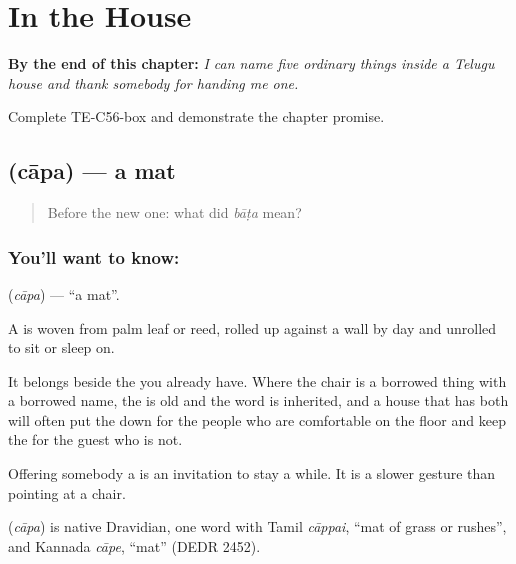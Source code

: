 
\chapter{In the House}
\label{ch:te-house}

\begin{chapteropening}
\textbf{By the end of this chapter:} \emph{I can name five ordinary things inside a Telugu house and thank somebody for handing me one.}

Complete TE-C56-box and demonstrate the chapter promise.
\end{chapteropening}

\section[\texorpdfstring{\te{చాప} (cāpa)}{చాప (cāpa)}]{ (cāpa) — a mat}

\label{lesson:TE-C56-mat}



\begin{quote}
Before the new one: what did \emph{bāṭa} mean?
\end{quote}

\subsection*{You'll want to know: }
\textbf{} (\emph{cāpa}) — \textquotedblleft{}a mat\textquotedblright{}.

A  is woven from palm leaf or reed, rolled up against a wall by day and unrolled to sit or sleep on.

It belongs beside the  you already have. Where the chair is a borrowed thing with a borrowed name, the  is old and the word is inherited, and a house that has both will often put the  down for the people who are comfortable on the floor and keep the  for the guest who is not.

Offering somebody a  is an invitation to stay a while. It is a slower gesture than pointing at a chair.

\begin{cousinweb}
\textbf{} (\emph{cāpa}) is native Dravidian, one word with Tamil \emph{cāppai}, \textquotedblleft{}mat of grass or rushes\textquotedblright{}, and Kannada \emph{cāpe}, \textquotedblleft{}mat\textquotedblright{} (DEDR 2452).
\end{cousinweb}

